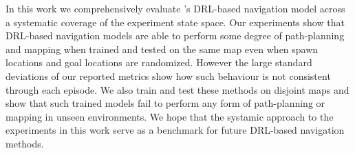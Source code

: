 In this work we comprehensively evaluate  \cite{MiPaViICLR2017}'s \NavAiiiCDiDiiL{} DRL-based navigation model across a systematic coverage of the experiment state space.
Our experiments show that DRL-based navigation models are able to perform some degree of path-planning and mapping when trained and tested on the same map even when spawn locations and goal locations are randomized. 
However the large standard deviations of our reported metrics show how such behaviour is not consistent through each episode. 
We also train and test these methods on disjoint maps and show that such trained models fail to perform any form of path-planning or mapping in unseen environments.
We hope that the systamic approach to the experiments in this work serve as a benchmark for future DRL-based navigation methods.

